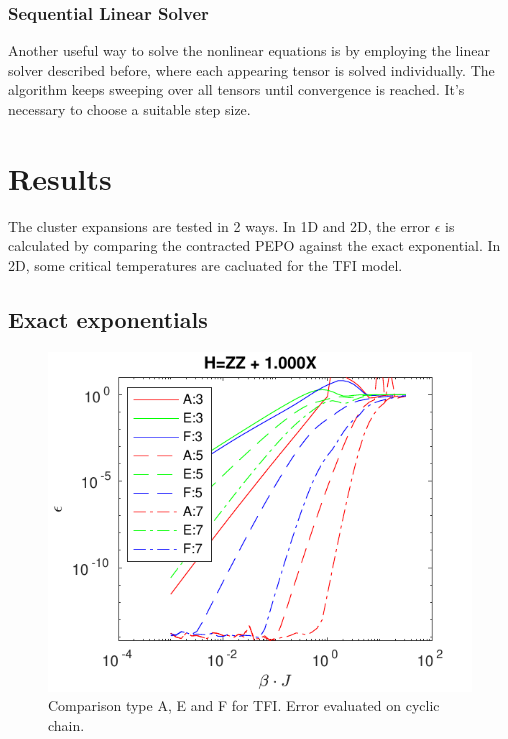 \documentclass[twocolumn]{article}
\newcounter{a}
\newcounter{b}
\begin{document}
\subsubsection{Sequential Linear Solver}
Another useful way to solve the nonlinear equations is by employing the linear solver described before, where each appearing tensor is solved individually. The algorithm keeps sweeping over all tensors until convergence is reached. It's necessary to choose a suitable step size.


\section{Results}
The cluster expansions are tested in 2 ways. In 1D and 2D, the error $\epsilon$ is calculated by comparing the contracted PEPO against the exact exponential. In 2D, some critical temperatures are cacluated for the TFI model.

\subsection{Exact exponentials}\label{subsec:exexp}
\begin{figure}[h!]
    \center
    \includegraphics[width=\linewidth]{../Figuren/benchmarking/t_ising_small.pdf}
    \caption{Comparison type A, E and F for TFI. Error evaluated on cyclic chain. }
    \label{fig:benchmark:tising}
\end{figure}
\end{document}
